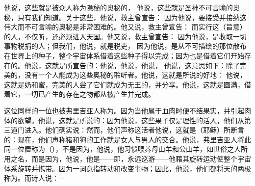 他说，这些就是被众人称为隐秘的奥秘的，  他说，这些就是圣神不可言喻的奥秘，只有我们知道。关于这些，他说，救主曾宣告：  因为他说，要接受并接纳这伟大而不可言喻的奥秘是非常困难的。他又说，救主曾宣告：  而实行这（旨意）的人，不仅听，还必须进入天国。他又说，救主曾宣告：  因为他说，是收取一切事物税捐的人；但我们，他说，就是税吏， 因为他说，是从不可描绘的那位散布在世界上的种子，整个宇宙体系借着这些种子得以完成；因为也是借着它们开始存在的。他说，这就是所宣告的：他说，他说，他说， 他说，这意思如下：除了完美的，没有一个人能成为这些奥秘的聆听者。他说，这就是所说的好地： 他说，这就是奶和蜜，完美的人尝了它们就成为无王的，并分享。他说，这就是圆满，借着它，一切已产生的存在之物都从被产生并完成。\par

这位同样的一位也被弗里吉亚人称为。因为当他属于血肉时便不结果实，并引起肉体的欲望。他说，这就是所说的：因为他说，这些果子仅是理性的活人，他们从第三道门进入。他们确实说：然而，他们声称这活者他说，这就是（耶稣）所断言的：现在，他们声称猪和狗的工作就是女人与男人的交合。他说，弗里吉亚人将此同一位置称为（），不是因为，他说，他习惯喂养母山羊和公山羊，如世俗之人所用之名，而是因为，他说，他是——即，永远巡游——他藉其旋转运动使整个宇宙体系旋转并携带。因为一词意指转动和改变事物；因此，他说，他们都将天的两极称为。而诗人说：—\par

